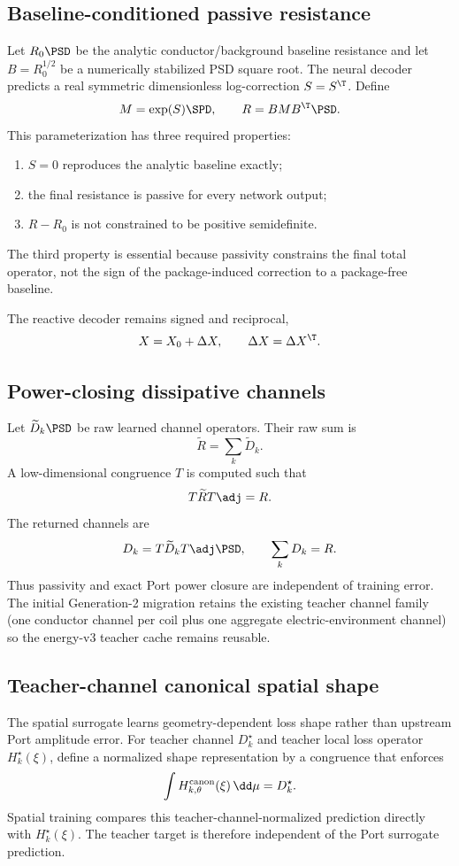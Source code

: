 \subsection{Baseline-conditioned passive resistance}

Let $R_0\PSD$ be the analytic conductor/background baseline resistance and let
$B=R_0^{1/2}$ be a numerically stabilized PSD square root.  The neural decoder
predicts a real symmetric dimensionless log-correction $S=S^\T$.  Define
\[
 M=\exp(S)\SPD,
 \qquad
 R=BMB^\T\PSD.
\]
This parameterization has three required properties:
\begin{enumerate}
\item $S=0$ reproduces the analytic baseline exactly;
\item the final resistance is passive for every network output;
\item $R-R_0$ is not constrained to be positive semidefinite.
\end{enumerate}
The third property is essential because passivity constrains the final total
operator, not the sign of the package-induced correction to a package-free
baseline.

The reactive decoder remains signed and reciprocal,
\[
 X=X_0+\Delta X,
 \qquad
 \Delta X=\Delta X^\T.
\]

\subsection{Power-closing dissipative channels}

Let $\widetilde D_k\PSD$ be raw learned channel operators.  Their raw sum is
\[
 \widetilde R=\sum_k\widetilde D_k.
\]
A low-dimensional congruence $T$ is computed such that
\[
 T\widetilde R T\adj=R.
\]
The returned channels are
\[
 D_k=T\widetilde D_kT\adj\PSD,
 \qquad
 \sum_kD_k=R.
\]
Thus passivity and exact Port power closure are independent of training error.
The initial Generation-2 migration retains the existing teacher channel family
(one conductor channel per coil plus one aggregate electric-environment
channel) so the energy-v3 teacher cache remains reusable.

\subsection{Teacher-channel canonical spatial shape}

The spatial surrogate learns geometry-dependent loss shape rather than upstream
Port amplitude error.  For teacher channel $D_k^\star$ and teacher local loss
operator $H_k^\star(\xi)$, define a normalized shape representation by a
congruence that enforces
\[
 \int H_{k,\theta}^{\rm canon}(\xi)\,\dd\mu
 =D_k^\star.
\]
Spatial training compares this teacher-channel-normalized prediction directly
with $H_k^\star(\xi)$.  The teacher target is therefore independent of the Port
surrogate prediction.

